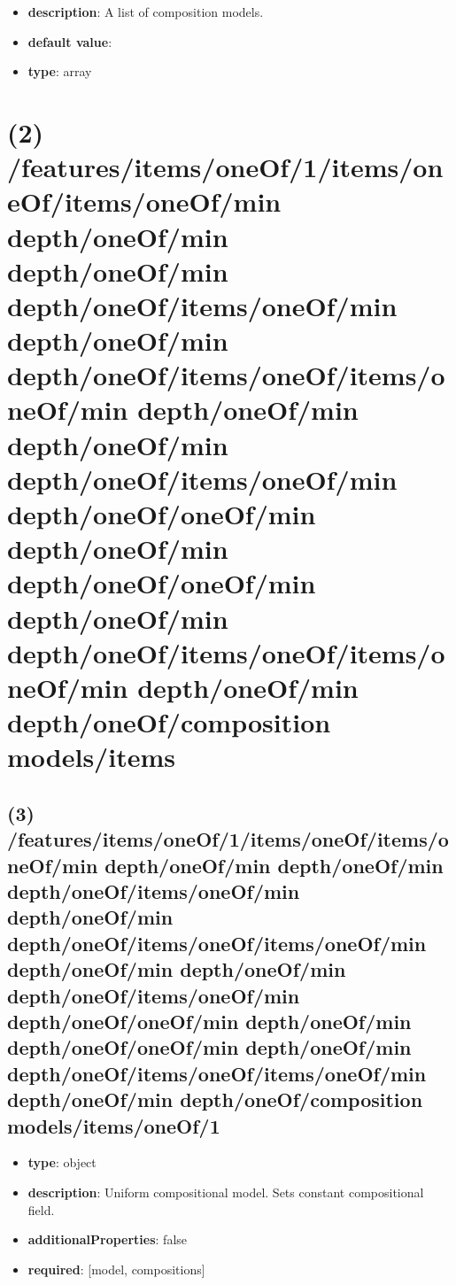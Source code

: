 \begin{itemize}[leftmargin=1em]\item {\bf description}: A list of composition models.
\item {\bf default value}: 
\item {\bf type}: array
\end{itemize}\section{(2) /features/items/oneOf/1/items/oneOf/items/oneOf/min depth/oneOf/min depth/oneOf/min depth/oneOf/items/oneOf/min depth/oneOf/min depth/oneOf/items/oneOf/items/oneOf/min depth/oneOf/min depth/oneOf/min depth/oneOf/items/oneOf/min depth/oneOf/oneOf/min depth/oneOf/min depth/oneOf/oneOf/min depth/oneOf/min depth/oneOf/items/oneOf/items/oneOf/min depth/oneOf/min depth/oneOf/composition models/items}

\subsection{(3) /features/items/oneOf/1/items/oneOf/items/oneOf/min depth/oneOf/min depth/oneOf/min depth/oneOf/items/oneOf/min depth/oneOf/min depth/oneOf/items/oneOf/items/oneOf/min depth/oneOf/min depth/oneOf/min depth/oneOf/items/oneOf/min depth/oneOf/oneOf/min depth/oneOf/min depth/oneOf/oneOf/min depth/oneOf/min depth/oneOf/items/oneOf/items/oneOf/min depth/oneOf/min depth/oneOf/composition models/items/oneOf/1}
\begin{itemize}[leftmargin=3em]\item {\bf type}: object
\item {\bf description}: Uniform compositional model. Sets constant compositional field.
\item {\bf additionalProperties}: false
\item {\bf required}: [model, compositions]\end{itemize}
